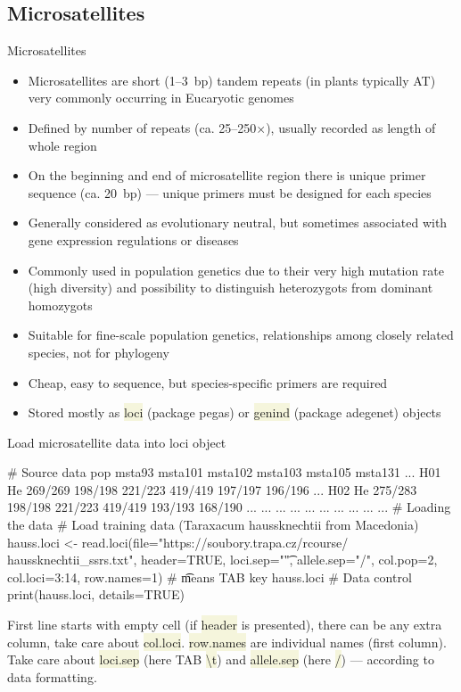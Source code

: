 \documentclass[compress, xelatex, 11pt, xcolor=svgnames, aspectratio=169, url={hyphens, lowtilde}]{beamer}
\renewcommand{\texttt}[1]{\colorbox{Beige}{{\ttfamily #1}}}
\begin{document}
\subsection{Microsatellites}

\begin{frame}{Microsatellites}
	\begin{itemize}
		\item Microsatellites are short (1--3~bp) tandem repeats (in plants typically AT) very commonly occurring in Eucaryotic genomes
		\item Defined by number of repeats (ca. 25--250$\times$), usually recorded as length of whole region
		\item On the beginning and end of microsatellite region there is unique primer sequence (ca. 20~bp) --- unique primers must be designed for each species
		\item Generally considered as evolutionary neutral, but sometimes associated with gene expression regulations or diseases
		\item Commonly used in population genetics due to their very high mutation rate (high diversity) and possibility to distinguish heterozygots from dominant homozygots
		\item Suitable for fine-scale population genetics, relationships among closely related species, not for phylogeny
		\item Cheap, easy to sequence, but species-specific primers are required
		\item Stored mostly as \texttt{loci} (package pegas) or \texttt{genind} (package adegenet) objects
	\end{itemize}
\end{frame}

\begin{frame}[fragile]{Load microsatellite data into loci object}
	\begin{spluscode}
    # Source data
        pop  msta93 msta101 msta102 msta103 msta105 msta131 ...
    H01  He 269/269 198/198 221/223 419/419 197/197 196/196 ...
    H02  He 275/283 198/198 221/223 419/419 193/193 168/190 ...
    ... ...     ...     ...     ...     ...     ...     ... ...
    # Loading the data
    # Load training data (Taraxacum haussknechtii from Macedonia)
    hauss.loci <- read.loci(file="https://soubory.trapa.cz/rcourse/
      haussknechtii_ssrs.txt", header=TRUE, loci.sep="\t", allele.sep="/",
      col.pop=2, col.loci=3:14, row.names=1) # \t means TAB key
    hauss.loci # Data control
    print(hauss.loci, details=TRUE)
	\end{spluscode}
	\vfill
	\begin{footnotesize}
		First line starts with empty cell (if \texttt{header} is presented), there can be any extra column, take care about \texttt{col.loci}. \texttt{row.names} are individual names (first column). Take care about \texttt{loci.sep} (here TAB \texttt{\textbackslash t}) and \texttt{allele.sep} (here \texttt{/}) --- \alert{according to data formatting}.
	\end{footnotesize}
	\vfill
\end{frame}
\end{document}
